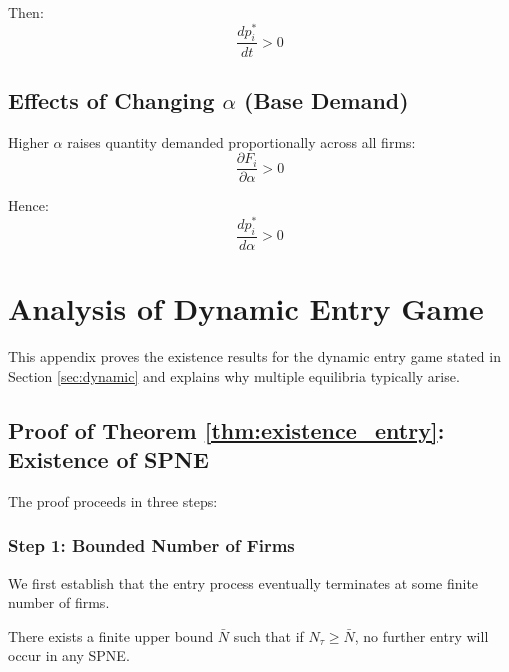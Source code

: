\documentclass{article}
\begin{document}
Then:
\begin{equation}
  \frac{dp_i^*}{dt} > 0
\end{equation}

\subsection{Effects of Changing $\alpha$ (Base Demand)}

Higher $\alpha$ raises quantity demanded proportionally across all firms:
\begin{equation}
  \frac{\partial F_i}{\partial \alpha} > 0
\end{equation}

Hence:
\begin{equation}
  \frac{dp_i^*}{d\alpha} > 0
\end{equation}

\section{Analysis of Dynamic Entry Game}
\label{app:dynamic_entry}

This appendix proves the existence results for the dynamic entry game stated in Section \ref{sec:dynamic} and explains why multiple equilibria typically arise.

\subsection{Proof of Theorem \ref{thm:existence_entry}: Existence of SPNE}

The proof proceeds in three steps:

\subsubsection*{Step 1: Bounded Number of Firms}

We first establish that the entry process eventually terminates at some finite number of firms.

\begin{lemma}
  There exists a finite upper bound $\bar{N}$ such that if $N_\tau \geq \bar{N}$, no further entry will occur in any SPNE.
\end{lemma}
\end{document}
